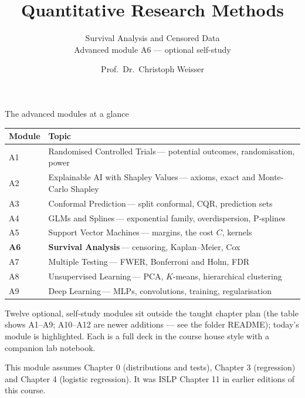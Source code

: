 \documentclass[aspectratio=169,11pt]{beamer}
\title{Quantitative Research Methods}
\subtitle{Survival Analysis and Censored Data\\[2pt]{\small Advanced module A6 --- optional self-study}}
\author{Prof.\ Dr.\ Christoph Weisser}
\date{}\graphicspath{{images/}}
\begin{document}
\begin{frame}[plain]\titlepage\end{frame}

\begin{frame}{The advanced modules at a glance}
  \vspace{-1.5mm}
  \begin{center}
  \scriptsize
  \setlength{\tabcolsep}{5pt}
  \renewcommand{\arraystretch}{1.30}
  \begin{tabular}{@{\hspace{2pt}}l >{\raggedright\arraybackslash}p{}@{\hspace{2pt}}}
    \toprule
    \textbf{Module} & \textbf{Topic} \\
    \midrule
     {\color{accent}A1} & Randomised Controlled Trials\,{\color{black!45}--- potential outcomes, randomisation, power} \\
    \rowcolor{black!3} {\color{accent}A2} & Explainable AI with Shapley Values\,{\color{black!45}--- axioms, exact and Monte-Carlo Shapley} \\
     {\color{accent}A3} & Conformal Prediction\,{\color{black!45}--- split conformal, CQR, prediction sets} \\
    \rowcolor{black!3} {\color{accent}A4} & GLMs and Splines\,{\color{black!45}--- exponential family, overdispersion, P-splines} \\
     {\color{accent}A5} & Support Vector Machines\,{\color{black!45}--- margins, the cost $C$, kernels} \\
    \rowcolor{accent!18} \textbf{A6} & \textbf{Survival Analysis}\,{\color{accent!75!black}--- censoring, Kaplan--Meier, Cox} \\
     {\color{accent}A7} & Multiple Testing\,{\color{black!45}--- FWER, Bonferroni and Holm, FDR} \\
    \rowcolor{black!3} {\color{accent}A8} & Unsupervised Learning\,{\color{black!45}--- PCA, $K$-means, hierarchical clustering} \\
     {\color{accent}A9} & Deep Learning\,{\color{black!45}--- MLPs, convolutions, training, regularisation} \\
    \bottomrule
  \end{tabular}
  \end{center}
  \vspace{2mm}
  {\scriptsize Twelve optional, self-study modules sit outside the taught
  chapter plan (the table shows A1--A9; A10--A12 are newer additions --- see the folder README); today's module is highlighted. Each is a full deck in the course
  house style with a companion lab notebook.\par\medskip This module assumes Chapter 0 (distributions and tests), Chapter 3 (regression) and Chapter 4 (logistic regression). It was ISLP Chapter 11 in earlier editions of this course.}
\end{frame}
\end{document}
